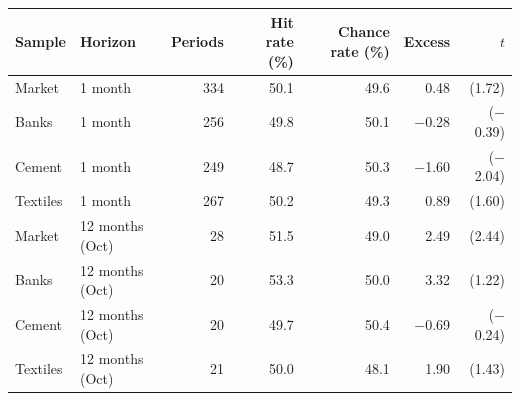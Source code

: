 \begin{tabular}{llrrrrr}
\toprule
Sample & Horizon & Periods & Hit rate (\%) & Chance rate (\%) & Excess & $t$ \\
\midrule
Market & 1 month & 334 & 50.1 & 49.6 & 0.48 & (1.72) \\
Banks & 1 month & 256 & 49.8 & 50.1 & \ensuremath{-}0.28 & (\ensuremath{-}0.39) \\
Cement & 1 month & 249 & 48.7 & 50.3 & \ensuremath{-}1.60 & (\ensuremath{-}2.04) \\
Textiles & 1 month & 267 & 50.2 & 49.3 & 0.89 & (1.60) \\
Market & 12 months (Oct) & 28 & 51.5 & 49.0 & 2.49 & (2.44) \\
Banks & 12 months (Oct) & 20 & 53.3 & 50.0 & 3.32 & (1.22) \\
Cement & 12 months (Oct) & 20 & 49.7 & 50.4 & \ensuremath{-}0.69 & (\ensuremath{-}0.24) \\
Textiles & 12 months (Oct) & 21 & 50.0 & 48.1 & 1.90 & (1.43) \\
\bottomrule
\end{tabular}
